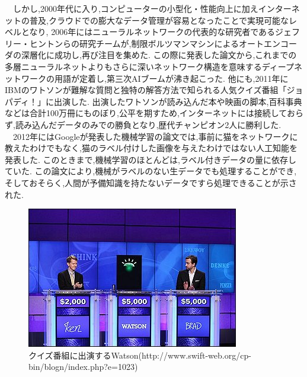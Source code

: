 　しかし,2000年代に入り,コンピューターの小型化・性能向上に加えインターネットの普及,クラウドでの膨大なデータ管理が容易となったことで実現可能なレベルとなり,
2006年にはニューラルネットワークの代表的な研究者であるジェフリー・ヒントンらの研究チームが,制限ボルツマンマシンによるオートエンコーダの深層化に成功し,再び注目を集めた.
この際に発表した論文から,これまでの多層ニューラルネットよりもさらに深いネットワーク構造を意味するディープネットワークの用語が定着し,第三次AIブームが沸き起こった.
他にも,2011年にIBMのワトソンが難解な質問と独特の解答方法で知られる人気クイズ番組「ジョパディ！」に出演した.\cite{webpage6}
出演したワトソンが読み込んだ本や映画の脚本,百科事典などは合計100万冊にものぼり,公平を期すため,インターネットには接続しておらず,読み込んだデータのみでの勝負となり,歴代チャンピオン2人に勝利した.\\
　2012年にはGoogleが発表した機械学習の論文では,事前に猫をネットワークに教えたわけでもなく,猫のラベル付けした画像を与えたわけではない人工知能を発表した.\cite{ronbun3}
このときまで,機械学習のほとんどは,ラベル付きデータの量に依存していた.
この論文により,機械がラベルのない生データでも処理することができ,そしておそらく,人間が予備知識を持たないデータですら処理できることが示された.
\newpage
\begin{figure}[!ht]
    \begin{screen}
    \begin{center}
        \includegraphics[scale=1.1, clip]{./img/Watson.jpg}
        \caption{クイズ番組に出演するWatson\newline(http://www.swift-web.org/cp-bin/blogn/index.php?e=1023)}
        \label{fig:クイズ番組に出演するWatson}
    \end{center}
\end{screen}
\end{figure}\\
\newpage
